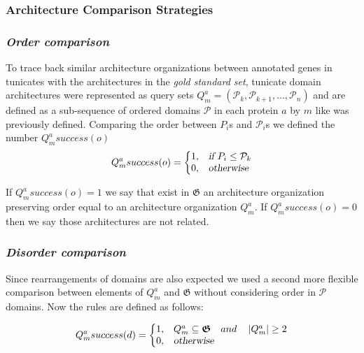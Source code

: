 \documentclass[11pt]{article}
\begin{document}
\subsubsection*{Architecture Comparison Strategies}
\subsubsection*{\textit{\textbf{O}rder comparison}}

To trace back similar architecture organizations between annotated genes in 
tunicates with the architectures in the \textsl{gold standard set}, tunicate 
domain architectures were represented as query sets  $Q^{a}_{m} = 
(\mathcal{P}_k,\mathcal{P}_{k+1},\ldots,\mathcal{P}_n)$ and are defined as a 
sub-sequence of ordered domains $\mathcal{P}$ in each protein $a$ by $m$ like  
was previously defined. Comparing the order between $P_i$s and $\mathcal{P}_i$s 
we defined the number $Q^{a}_{m}{success(o)}$
\begin{equation}
  Q^a_{m}{success(o)}=\left\{
  \begin{array}{@{}ll@{}}
    1, & \textsl{if}\ P_{i} \leq \mathcal{P}_{k} \\
    0, & \textsl{otherwise}
  \end{array}\right.
\end{equation} 

If $Q^a_{m}{success(o)} = 1$ we say that exist in $\boldsymbol{\mathfrak{G}}$ 
an architecture organization preserving order equal to an architecture 
organization $Q^{a}_{m}$. If $Q^a_{m}{success(o)} = 0$ then we say those 
architectures are not related.

\subsubsection*{\textit{\textbf{D}isorder comparison}}
Since rearrangements of domains are also expected we used a second more 
flexible comparison between elements of $Q^{a}_{m}$ and 
$\boldsymbol{\mathfrak{G}}$ without considering order in $\mathcal{P}$ domains. 
Now the rules are defined as follows:

\begin{equation}
  Q^a_{m}{success(d)}=\left\{
  \begin{array}{@{}ll@{}}
    1, & Q^a_{m} \subseteq  \boldsymbol{\mathfrak{G}} \quad and \quad \left|Q^a_{m}\right| \geq 2 \\
    0, & \textsl{otherwise}
  \end{array}\right.
\end{equation}
\end{document}
